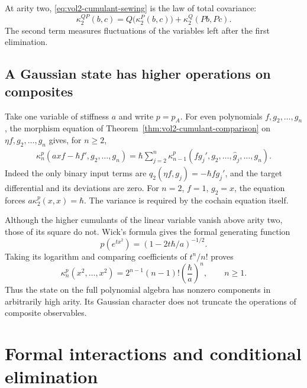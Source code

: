 At arity two, \eqref{eq:vol2-cumulant-sewing} is the law of
total covariance:
\begin{equation}\label{eq:vol2-total-covariance}
 \kappa_2^{QP}(b,c)
   =Q\bigl(\kappa_2^P(b,c)\bigr)
                       +\kappa_2^Q(Pb,Pc).
\end{equation}
The second term measures fluctuations of the variables left
after the first elimination.

\subsection{A Gaussian state has higher operations on composites}

Take one variable of stiffness $a$ and write $p=p_A$.
For even polynomials $f,g_2,\ldots,g_n$, the morphism equation
of Theorem~\ref{thm:vol2-cumulant-comparison} on
$\eta f,g_2,\ldots,g_n$ gives, for $n\geq2$,
\begin{equation}\label{eq:vol2-higher-ward}
 \begin{split}
 \kappa_n^p(axf-\hbar f',g_2,\ldots,g_n)
  =\hbar\sum_{j=2}^n
    \kappa_{n-1}^p(fg_j',g_2,\ldots,\widehat g_j,\ldots,g_n).
 \end{split}
\end{equation}
Indeed the only binary input terms are
$q_2(\eta f,g_j)=-\hbar fg_j'$, and the target differential
and its deviations are zero. For $n=2$, $f=1$, $g_2=x$,
the equation forces $a\kappa_2^p(x,x)=\hbar$.
The variance is required by the cochain equation itself.

Although the higher cumulants of the linear variable vanish
above arity two, those of its square do not.
Wick's formula gives the formal generating function
\[
 p(e^{tx^2})=(1-2t\hbar/a)^{-1/2}.
\]
Taking its logarithm and comparing coefficients of $t^n/n!$
proves
\begin{equation}\label{eq:vol2-square-cumulants}
 \kappa_n^p(x^2,\ldots,x^2)
   =2^{n-1}(n-1)!\left(\frac{\hbar}{a}\right)^n,
 \qquad n\geq1.
\end{equation}
Thus the state on the full polynomial algebra has nonzero
components in arbitrarily high arity. Its Gaussian character
does not truncate the operations of composite observables.

\section{Formal interactions and conditional elimination}
\label{sec:vol2-interacting-elimination}

